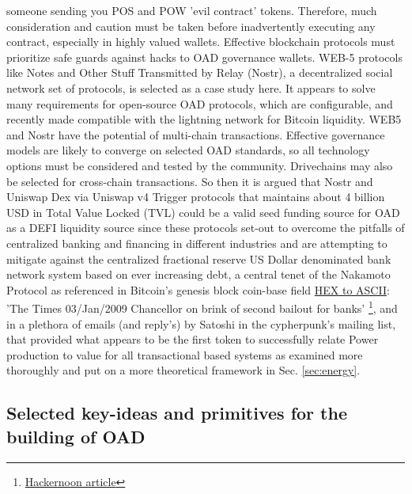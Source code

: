 \documentclass[final,5p,times,twocolumn,authoryear]{elsarticle}
\begin{document}
someone sending you POS and POW 'evil contract' tokens. Therefore, much consideration and caution must be taken before inadvertently executing any contract, especially in highly valued wallets. Effective blockchain protocols must prioritize safe guards against hacks to OAD governance wallets. WEB-5 protocols like Notes and Other Stuff Transmitted by Relay (Nostr), a decentralized social network set of protocols, is selected as a case study here.  It appears to solve many requirements for open-source OAD protocols, which are configurable, and recently made compatible with the lightning network for Bitcoin liquidity. WEB5 and Nostr have the potential of multi-chain transactions. Effective governance models are likely to converge on selected OAD standards, so all technology options must be considered and tested by the community. Drivechains may also be selected for cross-chain transactions.  So then it is argued that Nostr and  Uniswap Dex via Uniswap v4 Trigger protocols that maintains about 4 billion USD in Total Value Locked (TVL) could be a valid seed funding source for OAD as a DEFI liquidity source since these protocols set-out to overcome the pitfalls of centralized banking and financing in different industries and are attempting to mitigate against the centralized fractional reserve US Dollar denominated bank network system based on ever increasing debt, a central tenet of the Nakamoto Protocol as referenced in Bitcoin's genesis block \textrm{coin-base field} \href{https://www.Blockchain.com/btc/tx/4a5e1e4baab89f3a32518a88c31bc87f618f76673e2cc77ab2127b7afdeda33b}{HEX to ASCII}:  'The Times 03/Jan/2009 Chancellor on brink of second bailout for banks' \footnote{\href{https://hackernoon.com/chancellor-on-brink-of-second-bailout-for-banks-where-to-find-this-on-the-bitcoin-blockchain-hm4k34v4}{Hackernoon article}}, and in a plethora of emails (and reply's) by Satoshi in the cypherpunk's mailing list, that provided what appears to be the first token to successfully relate Power production to value for all transactional based systems as examined more thoroughly and put on a more theoretical framework in Sec. \ref{sec:energy}.

\subsection{Selected key-ideas and primitives for the building of OAD}
\label{subsec: review}
\end{document}
